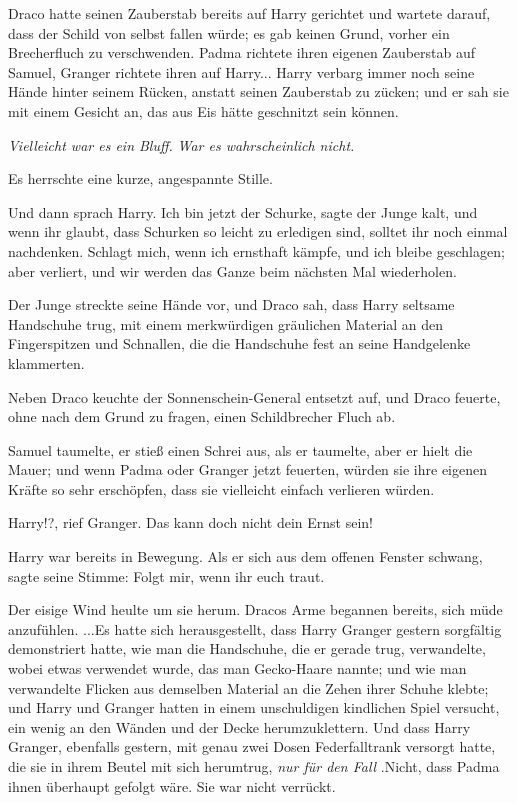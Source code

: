 Draco hatte seinen Zauberstab bereits auf Harry gerichtet und wartete darauf,
dass der Schild von selbst fallen würde; es gab keinen Grund, vorher ein
Brecherfluch zu verschwenden. Padma richtete ihren eigenen Zauberstab auf
Samuel, Granger richtete ihren auf Harry... Harry verbarg immer noch seine Hände
hinter seinem Rücken, anstatt seinen Zauberstab zu zücken; und er sah sie mit
einem Gesicht an, das aus Eis hätte geschnitzt sein können.

\emph{Vielleicht war es ein Bluff.}
\emph{War es wahrscheinlich nicht.}

Es herrschte eine kurze, angespannte Stille.

Und dann sprach Harry. \glqq{}Ich bin jetzt der Schurke\grqq{}, sagte der Junge
kalt, \glqq{}und wenn ihr glaubt, dass Schurken so leicht zu erledigen sind,
solltet ihr noch einmal nachdenken. Schlagt mich, wenn ich ernsthaft kämpfe, und
ich bleibe geschlagen; aber verliert, und wir werden das Ganze beim nächsten Mal
wiederholen.\grqq{}

Der Junge streckte seine Hände vor, und Draco sah, dass Harry seltsame
Handschuhe trug, mit einem merkwürdigen gräulichen Material an den Fingerspitzen
und Schnallen, die die Handschuhe fest an seine Handgelenke klammerten.

Neben Draco keuchte der Sonnenschein-General entsetzt auf, und Draco feuerte,
ohne nach dem Grund zu fragen, einen Schildbrecher Fluch ab.

Samuel taumelte, er stieß einen Schrei aus, als er taumelte, aber er hielt die
Mauer; und wenn Padma oder Granger jetzt feuerten, würden sie ihre eigenen
Kräfte so sehr erschöpfen, dass sie vielleicht einfach verlieren würden.

\glqq{}Harry!?\grqq{}, rief Granger. \glqq{}Das kann doch nicht dein Ernst sein!\grqq{}

Harry war bereits in Bewegung. Als er sich aus dem offenen Fenster schwang,
sagte seine Stimme: \glqq{}Folgt mir, wenn ihr euch traut.\grqq{}

Der eisige Wind heulte um sie herum. Dracos Arme begannen bereits, sich müde
anzufühlen. ...Es hatte sich herausgestellt, dass Harry Granger gestern
sorgfältig demonstriert hatte, wie man die Handschuhe, die er gerade trug,
verwandelte, wobei etwas verwendet wurde, das man \glqq{}Gecko-Haare\grqq{}
nannte; und wie man verwandelte Flicken aus demselben Material an die Zehen
ihrer Schuhe klebte; und Harry und Granger hatten in einem unschuldigen
kindlichen Spiel versucht, ein wenig an den Wänden und der Decke
herumzuklettern. Und dass Harry Granger, ebenfalls gestern, mit genau zwei Dosen
Federfalltrank versorgt hatte, die sie in ihrem Beutel mit sich herumtrug,
\emph{\glqq{}nur für den Fall\grqq{}} .Nicht, dass Padma ihnen überhaupt gefolgt
wäre. Sie war nicht verrückt.

